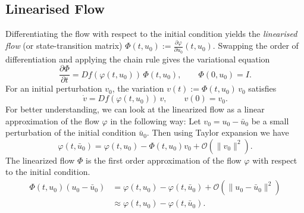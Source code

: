 \documentclass[11pt,a4paper]{article}
\begin{document}
\subsection{Linearised Flow}
Differentiating the flow with respect to the initial condition yields the
\emph{linearised flow} (or state-transition matrix)
$\Phi(t, u_0) := \frac{\partial \varphi}{\partial u_0}(t, u_0)$.  Swapping
the order of differentiation and applying the chain rule gives the variational
equation
\begin{equation}\label{eq:lin_flow}
  \frac{\partial \Phi}{\partial t} = Df(\varphi(t, u_0))\,\Phi(t, u_0),
  \qquad \Phi(0, u_0) = I.
\end{equation}
For an initial perturbation $v_0$, the variation
$v(t) := \Phi(t, u_0)\,v_0$ satisfies
\begin{equation}\label{eq:lin_var}
  \dot{v} = Df(\varphi(t, u_0))\,v, \qquad v(0) = v_0.
\end{equation}
For better understanding, we can look at the linearized flow as a linear approximation of the flow $\varphi$ in the following way: Let $v_0=u_0-\bar{u}_0$ be a small perturbation of the initial condition $\bar{u}_0$. Then using Taylor expansion we have
\begin{equation*}
    \varphi(t,\bar{u}_0) = \varphi(t,u_0) - \Phi(t,u_0)v_0 + \mathcal{O}(\|v_0\|^2).
\end{equation*}
The linearized flow $\Phi$ is the first order approximation of the flow $\varphi$ with respect to the initial condition.
\begin{align*}
    \Phi(t,u_0)(u_0-\bar{u}_0) &= \varphi(t,u_0) - \varphi(t,\bar{u}_0) + \mathcal{O}(\|u_0-\bar{u}_0\|^2)\\
    &\approx \varphi(t,u_0) - \varphi(t,\bar{u}_0).
\end{align*}
\end{document}
